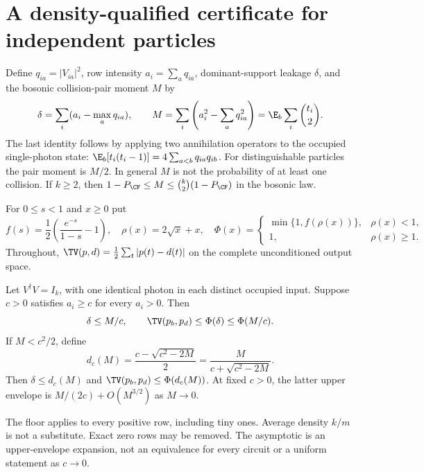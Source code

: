 \section{A density-qualified certificate for independent particles}\label{sec:certificate}
Define $q_{ia}=|V_{ia}|^2$, row intensity $a_i=\sum_aq_{ia}$, dominant-support leakage $\delta$, and the bosonic collision-pair moment $M$ by
\begin{equation}
 \delta=\sum_i(a_i-\max_aq_{ia}),\qquad
 M=\sum_i\left(a_i^2-\sum_aq_{ia}^2\right)
   =\E_b\sum_i\binom{t_i}{2}.\label{eq:moment}
\end{equation}
The last identity follows by applying two annihilation operators to the occupied single-photon state: $\E_b[t_i(t_i-1)]=4\sum_{a<b}q_{ia}q_{ib}$. For distinguishable particles the pair moment is $M/2$. In general $M$ is not the probability of at least one collision. If $k\ge2$, then $1-P_{\CF}\le M\le\binom{k}{2}(1-P_{\CF})$ in the bosonic law.

For $0\le s<1$ and $x\ge0$ put
\begin{equation}
 f(s)=\frac12\left(\frac{e^{-s}}{1-s}-1\right),\quad
 \rho(x)=2\sqrt{x}+x,\quad
 \Phi(x)=\begin{cases}\min\{1,f(\rho(x))\},&\rho(x)<1,\\1,&\rho(x)\ge1.\end{cases}\label{eq:envelope}
\end{equation}
Throughout, $\TV(p,d)=\tfrac12\sum_t|p(t)-d(t)|$ on the complete unconditioned output space.

\begin{theorem}\label{thm:density}
Let $V^\dagger V=I_k$, with one identical photon in each distinct occupied input. Suppose $c>0$ satisfies $a_i\ge c$ for every $a_i>0$. Then
\begin{equation}
 \delta\le M/c,\qquad \TV(p_b,p_d)\le\Phi(\delta)\le\Phi(M/c).\label{eq:coarse}
\end{equation}
If $M<c^2/2$, define
\begin{equation}
 d_c(M)=\frac{c-\sqrt{c^2-2M}}2
       =\frac{M}{c+\sqrt{c^2-2M}}.
\end{equation}
Then $\delta\le d_c(M)$ and $\TV(p_b,p_d)\le\Phi(d_c(M))$. At fixed $c>0$, the latter upper envelope is $M/(2c)+O(M^{3/2})$ as $M\to0$.
\end{theorem}
The floor applies to every positive row, including tiny ones. Average density $k/m$ is not a substitute. Exact zero rows may be removed. The asymptotic is an upper-envelope expansion, not an equivalence for every circuit or a uniform statement as $c\to0$.

